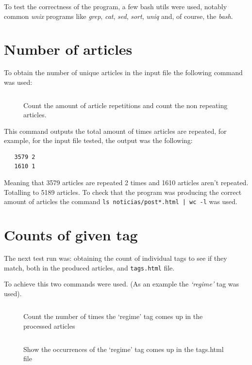 \documentclass[a4paper]{report}
\begin{document}
To test the correctness of the program, a few bash utils were used, notably
common \textit{unix} programs like \textit{grep}, \textit{cat}, \textit{sed},
\textit{sort}, \textit{uniq} and, of course, the \textit{bash}.

\section{Number of articles}

To obtain the number of unique articles in the input file the following command
was used:
\begin{figure}[H]
    \inputminted{bash}{./test_number_of_articles.sh}
    \caption{Count the amount of article repetitions and count the non repeating
    articles.}
\end{figure}

This command outputs the total amount of times articles are repeated, for
example, for the input file tested, the output was the following:

\begin{verbatim}
   3579 2
   1610 1
\end{verbatim}

Meaning that 3579 articles are repeated 2 times and 1610 articles aren't
repeated. Totalling to 5189 articles. To check that the program was producing
the correct amount of articles the command
\verb!ls noticias/post*.html | wc -l! was used.

\section{Counts of given tag}

The next test run was: obtaining the count of individual tags to see if they
match, both in the produced articles, and \texttt{tags.html} file.

To achieve this two commands were used. (As an example the \textit{`regime'}
tag was used).

\begin{figure}[H]
    \inputminted{bash}{./test_count_regime_posts.sh}
    \caption{Count the number of times the `regime' tag comes up in the
    processed articles}
\end{figure}

\begin{figure}[H]
    \inputminted{bash}{./test_count_regime_tags.sh}
    \caption{Show the occurrences of the `regime' tag comes up in the tags.html
    file}
\end{figure}
\end{document}

